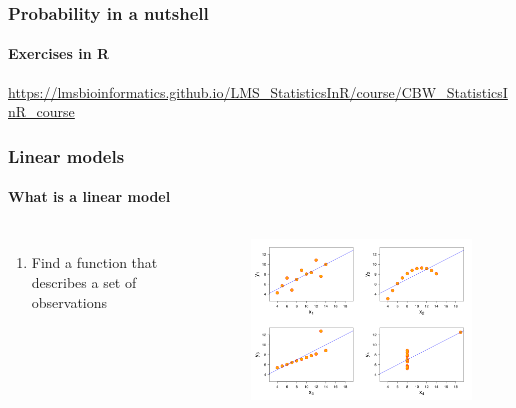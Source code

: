 \documentclass[aspectratio=43]{beamer}
\begin{document}
\begin{frame}
	
	\frametitle{Probability in a nutshell}
	\framesubtitle{Exercises in R}
	
	\footnotesize

	\href{https://lmsbioinformatics.github.io/LMS_StatisticsInR/course/CBW_StatisticsInR_course.html}{https://lmsbioinformatics.github.io/LMS\_StatisticsInR/course/CBW\_StatisticsInR\_course}

\end{frame}

%
%

\begin{frame}


\end{frame}

\begin{frame}

	\frametitle{Linear models}
	\framesubtitle{What is a linear model}

	\footnotesize
	
	\begin{columns}
		
		
		\begin{enumerate}
			\item Find a function that describes a set of observations
		\end{enumerate}
		
		
		\begin{figure}[!htb]
			\includegraphics[width = \linewidth]{plots/part2/linear_model.png}
		\end{figure}
	
	\end{columns}

\end{frame}
\end{document}
